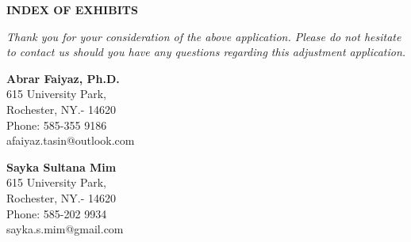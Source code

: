 \documentclass{letter}
\newcounter{labelcounter}
\newcommand{\centerlabel}[1]{
\stepcounter{labelcounter}
\newpage

    \thispagestyle{empty}
    \begin{center}
        \vspace*{\fill}
        \Huge Exhibit-\thelabelcounter \\ \vspace{1cm} \large #1
        \vspace*{\fill}
    \end{center}
    \newpage
}
\begin{document}
\begin{center}
\textbf{INDEX OF EXHIBITS}\\
\end{center}

\vspace{1.5cm}

\vfill

\textit{Thank you for your consideration of the above application. Please do not hesitate to contact us should you have any questions regarding this adjustment application.}

\begin{minipage}[t]{0.5\textwidth}

\vspace{2cm}
\textbf{Abrar Faiyaz, Ph.D.} \\
615 University Park,\\
Rochester, NY.- 14620\\
Phone: 585-355 9186 \\
afaiyaz.tasin@outlook.com \\
\end{minipage}%
\begin{minipage}[t]{0.5\textwidth}
\vspace{2cm}
\begin{flushright}
\textbf{Sayka Sultana Mim} \\
615 University Park,\\
Rochester, NY.- 14620\\
Phone: 585-202 9934 \\
sayka.s.mim@gmail.com\\
\end{flushright}
\end{minipage}













% 
% 
\end{document}
